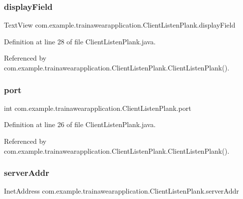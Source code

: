 \subsubsection{\texorpdfstring{displayField}{displayField}}
{\footnotesize\ttfamily Text\+View com.\+example.\+trainawearapplication.\+Client\+Listen\+Plank.\+display\+Field\hspace{0.3cm}{\ttfamily [private]}}



Definition at line 28 of file Client\+Listen\+Plank.\+java.



Referenced by com.\+example.\+trainawearapplication.\+Client\+Listen\+Plank.\+Client\+Listen\+Plank().

\mbox{\label{classcom_1_1example_1_1trainawearapplication_1_1_client_listen_plank_aa394560dfa0da718f5ca639b82795395}} 
\subsubsection{\texorpdfstring{port}{port}}
{\footnotesize\ttfamily int com.\+example.\+trainawearapplication.\+Client\+Listen\+Plank.\+port\hspace{0.3cm}{\ttfamily [private]}}



Definition at line 26 of file Client\+Listen\+Plank.\+java.



Referenced by com.\+example.\+trainawearapplication.\+Client\+Listen\+Plank.\+Client\+Listen\+Plank().

\mbox{\label{classcom_1_1example_1_1trainawearapplication_1_1_client_listen_plank_ae4ec71dafa5b734e69c3576bda12e0b8}} 
\subsubsection{\texorpdfstring{serverAddr}{serverAddr}}
{\footnotesize\ttfamily Inet\+Address com.\+example.\+trainawearapplication.\+Client\+Listen\+Plank.\+server\+Addr}



